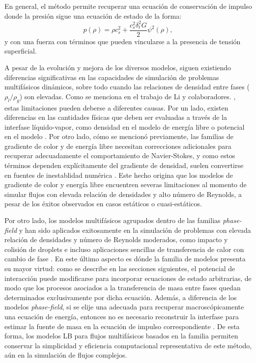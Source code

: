 En general, el m\'etodo \pp{} permite recuperar una ecuaci\'on de conservaci\'on de impulso donde la presi\'on sigue una ecuaci\'on de estado de la forma:
\begin{equation}
	p(\rho) = \rho c_s^2 + \dfrac{c_s^2 \delta_t^2 G}{2} \psi^2 (\rho),
\end{equation}
y con una fuerza con t\'erminos que pueden vincularse a la presencia de tensi\'on superficial.
\bigskip


A pesar de la evoluci\'on y mejora de los diversos modelos, siguen existiendo diferencias significativas en las capacidades de simulaci\'on de problemas multif\'asicos din\'amicos, sobre todo cuando las relaciones de densidad entre fases ($\rho_l/\rho_g$) son elevadas. Como se menciona en el trabajo de Li y colaboradores. \cite{li_lattice_2016}, estas limitaciones pueden deberse a diferentes causas. Por un lado, existen diferencias en las cantidades f\'isicas que deben ser evaluadas a trav\'es de la interfase l\'iquido-vapor, como densidad en el modelo de energ\'ia libre o potencial en el modelo \pp{}. Por otro lado, c\'omo se mencion\'o previamente, las familias de gradiente de color y de energ\'ia libre necesitan correcciones adicionales para recuperar adecuadamente el comportamiento de Navier-Stokes, y como estos t\'erminos dependen expl\'icitamente del gradiente de densidad, suelen convertirse en fuentes de inestablidad num\'erica \cite{leclaire_unsteady_2014,leclaire_enhanced_2013,huang_simulations_2013}. Este hecho origina que los modelos de gradiente de color y energ\'ia libre encuentren severas limitaciones al momento de simular flujos con elevada relaci\'on de densidades y alto n\'umero de Reynolds, a pesar de los \'exitos observados en casos est\'aticos o cuasi-est\'aticos.

Por otro lado, los modelos multif\'asicos agrupados dentro de las familias \emph{phase-field} y \pp{} han sido aplicados exitosamente en la simulaci\'on de problemas con elevada relaci\'on de densidades y n\'umero de Reynolds moderados, como impacto y colisi\'on de droplets \cite{li_lattice_2013,lee_stable_2005} e incluso aplicaciones sencillas de transferencia de calor con cambio de fase \cite{safari_consistent_2014,markus_pool_2012,gong_lattice_2015}. En este \'ultimo aspecto es d\'onde la familia de modelos \pp{} presenta su mayor virtud: como se describe en las secciones siguientes, el potencial de interacci\'on puede modificarse para incorporar ecuaciones de estado arbitrarias, de modo que los procesos asociados a la transferencia de masa entre fases quedan determinados exclusivamente por  dicha ecuaci\'on. Adem\'as, a diferencia de los modelos \emph{phase-field}, si se elije una \lbe{} adecuada para recuperar macrosc\'opicamente una ecuaci\'on de energ\'ia, entonces no es necesario reconstruir la interfase para estimar la fuente de masa en la ecuaci\'on de impulso correspondiente \cite{safari_consistent_2014,safari_extended_2013}. De esta forma, los modelos LB para flujos multif\'asicos basados en la familia \pp{} permiten conservar la simplicidad y eficiencia computacional representativa de este m\'etodo, a\'un en la simulaci\'on de flujos complejos.


